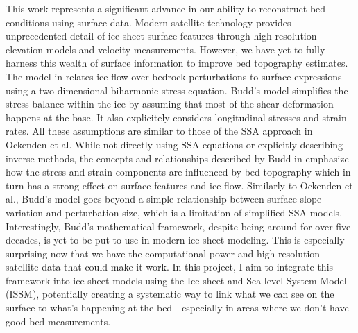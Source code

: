 This work represents a significant advance in our ability to reconstruct bed conditions using surface data. Modern satellite technology provides unprecedented detail of ice sheet surface features through high-resolution elevation models and velocity measurements. However, we have yet to fully harness this wealth of surface information to improve bed topography estimates.
The model in \cite{Budd_1970} relates ice flow over bedrock perturbations to surface expressions using a two-dimensional biharmonic stress equation. Budd's model simplifies the stress balance within the ice by assuming that most of the shear deformation happens at the base. It also explicitely considers longitudinal stresses and strain-rates. All these assumptions are similar to those of the SSA approach in Ockenden et al. While not directly using SSA equations or explicitly describing inverse methods, the concepts and relationships described by Budd in\cite{Budd_1970} emphasize how the stress and strain components are influenced by bed topography which in turn has a strong effect on surface features and ice flow. Similarly to Ockenden et al., Budd's model goes beyond a simple relationship between surface-slope variation and perturbation size, which is a limitation of simplified SSA models\cite{Budd_1970}.
Interestingly, Budd's mathematical framework, despite being around for over five decades, is yet to be put to use in modern ice sheet modeling. This is especially surprising now that we have the computational power and high-resolution satellite data that could make it work. In this project, I aim to integrate this framework into ice sheet models using the Ice-sheet and Sea-level System Model (ISSM), potentially creating a systematic way to link what we can see on the surface to what's happening at the bed - especially in areas where we don't have good bed measurements.